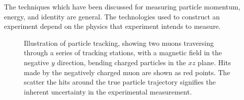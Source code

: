 


The techniques which have been discussed for measuring particle momentum, 
energy, and identity are general.
The technologies used to construct an experiment depend on the physics that 
experiment intends to measure.

\begin{figure}
  \centering
  
  \caption{%
    Illustration of particle tracking, showing two muons traversing through a 
    series of tracking stations, with a magnetic field in the negative $y$ 
    direction, bending charged particles in the $xz$ plane.
    Hits made by the negatively charged muon are shown as red points.
    The scatter the hits around the true particle trajectory signifies the 
    inherent uncertainty in the experimental measurement.
  }
  \label{fig:intro:lhcb:tracking}
\end{figure}


